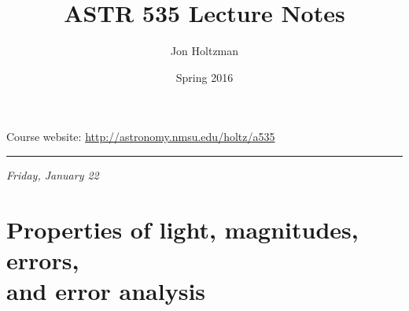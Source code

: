 \documentclass[12pt]{article}
\title{\vspace{-0.75in}ASTR 535 Lecture Notes}
\author{Jon Holtzman}
\date{Spring 2016}
\newcommand{\mydate}[1]{
    \begin{flushright}
        \rule{\textwidth}{0.4pt} %
        \footnotesize\hfill\textit{#1}
    \end{flushright}}
\begin{document}
\maketitle

Course website: \url{http://astronomy.nmsu.edu/holtz/a535}

\setlength{\parskip}{0ex}
\tableofcontents


\newpage
\setlength{\parskip}{1ex}
\mydate{Friday, January 22}
\section{Properties of light, magnitudes, errors,\\
and error analysis}
\end{document}
